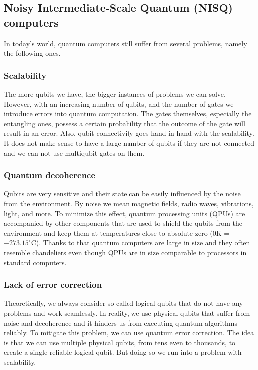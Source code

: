 \subsection{Noisy Intermediate-Scale Quantum (NISQ) computers}
In today's world, quantum computers still suffer from several problems, namely the following ones.

\subsubsection{Scalability}
The more qubits we have, the bigger instances of problems we can solve. However, with an increasing number of qubits, and the number of gates we introduce errors into quantum computation. The gates themselves, especially the entangling ones, possess a certain probability that the outcome of the gate will result in an error. Also, qubit connectivity goes hand in hand with the scalability. It does not make sense to have a large number of qubits if they are not connected and we can not use multiqubit gates on them.

\subsubsection{Quantum decoherence}
Qubits are very sensitive and their state can be easily influenced by the noise from the environment. By noise we mean magnetic fields, radio waves, vibrations, light, and more. To minimize this effect, quantum processing units (QPUs) are accompanied by other components that are used to shield the qubits from the environment and keep them at temperatures close to absolute zero ($0$K = $-273.15^{\circ}$C). Thanks to that quantum computers are large in size and they often resemble chandeliers even though QPUs are in size comparable to processors in standard computers.

\subsubsection{Lack of error correction}
Theoretically, we always consider so-called logical qubits that do not have any problems and work seamlessly. In reality, we use physical qubits that suffer from noise and decoherence and it hinders us from executing quantum algorithms reliably. To mitigate this problem, we can use quantum error correction. The idea is that we can use multiple physical qubits, from tens even to thousands, to create a single reliable logical qubit. But doing so we run into a problem with scalability. 

